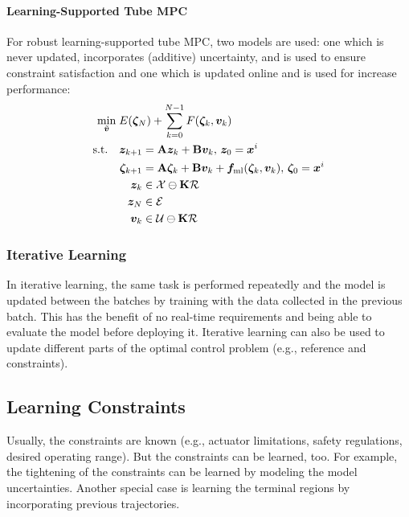 				\paragraph{Learning-Supported Tube MPC}
					For robust learning-supported tube MPC, two models are used: one which is never updated, incorporates (additive) uncertainty, and is used to ensure constraint satisfaction and one which is updated online and is used for increase performance:
					\begin{equation}
						\begin{aligned}
							\min_{\tilde{\bm{v}}}\; & E(\bm{\zeta}_N) + \sum_{k = 0}^{N - 1} F(\bm{\zeta}_k, \bm{v}_k) \\
							\text{s.t.}\quad         &
							\begin{aligned}[t]
								\bm{z}_{k + 1}     & = \bm{\mathrm{A}} \bm{z}_k + \bm{\mathrm{B}} \bm{v}_k,\, \bm{z}_0 = \bm{x}^i                                                         \\
								\bm{\zeta}_{k + 1} & = \bm{\mathrm{A}} \bm{\zeta}_k + \bm{\mathrm{B}} \bm{v}_k + \bm{f}_\mathrm{ml}(\bm{\zeta}_k, \bm{v}_k),\, \bm{\zeta}_0 = \bm{x}^i \\
								\bm{z}_k           & \in \mathcal{X} \ominus \bm{\mathrm{K}} \mathcal{R}                                                                              \\
								\bm{z}_N           & \in \mathcal{E}                                                                                                          \\
								\bm{v}_k           & \in \mathcal{U} \ominus \bm{\mathrm{K}} \mathcal{R}
							\end{aligned}
						\end{aligned}
					\end{equation}

			\subsubsection{Iterative Learning}
				In iterative learning, the same task is performed repeatedly and the model is updated between the batches by training with the data collected in the previous batch. This has the benefit of no real-time requirements and being able to evaluate the model before deploying it. Iterative learning can also be used to update different parts of the optimal control problem (e.g., reference and constraints).

		\subsection{Learning Constraints}
			Usually, the constraints are known (e.g., actuator limitations, safety regulations, desired operating range). But the constraints can be learned, too. For example, the tightening of the constraints can be learned by modeling the model uncertainties. Another special case is learning the terminal regions by incorporating previous trajectories.


